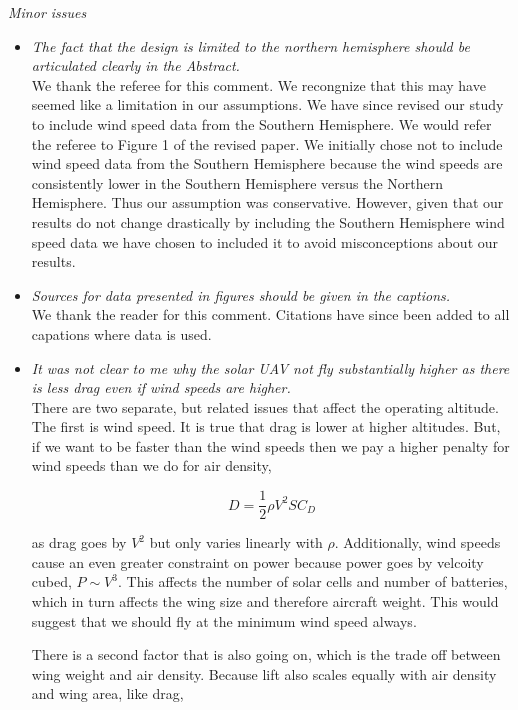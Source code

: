 \documentclass[10pt, a4paper]{article}
\begin{document}
\emph{Minor issues}
\begin{itemize}
    \item \emph{The fact that the design is limited to the northern hemisphere should be articulated clearly in the Abstract.} \\
        We thank the referee for this comment.  We recongnize that this may have seemed like a limitation in our assumptions.  We have since revised our study to include wind speed data from the Southern Hemisphere.  We would refer the referee to Figure 1 of the revised paper.  We initially chose not to include wind speed data from the Southern Hemisphere because the wind speeds are consistently lower in the Southern Hemisphere versus the Northern Hemisphere.  Thus our assumption was conservative.  However, given that our results do not change drastically by including the Southern Hemisphere wind speed data we have chosen to included it to avoid misconceptions about our results. 

    \item \emph{Sources for data presented in figures should be given in the captions.} \\
        We thank the reader for this comment.  Citations have since been added to all capations where data is used.  

    \item \emph{It was not clear to me why the solar UAV not fly substantially higher as there is less drag even if wind speeds are higher.} \\
    There are two separate, but related issues that affect the operating altitude.  The first is wind speed.  It is true that drag is lower at higher altitudes.  But, if we want to be faster than the wind speeds then we pay a higher penalty for wind speeds than we do for air density, 

    \begin{equation}
        D = \frac{1}{2} \rho V^2 S C_D
    \end{equation}
    
    as drag goes by $V^2$ but only varies linearly with $\rho$.  Additionally, wind speeds cause an even greater constraint on power because power goes by velcoity cubed, $P \sim V^3$.  This affects the number of solar cells and number of batteries, which in turn affects the wing size and therefore aircraft weight. This would suggest that we should fly at the minimum wind speed always.  

    There is a second factor that is also going on, which is the trade off between wing weight and air density.  Because lift also scales equally with air density and wing area, like drag, 


\end{itemize}
\end{document}
